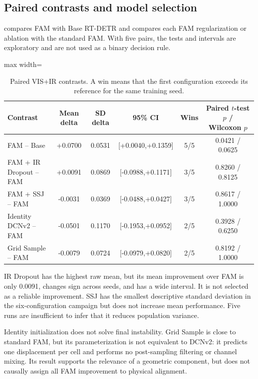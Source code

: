\subsection{Paired contrasts and model selection}

 compares FAM with Base RT-DETR and compares each FAM
regularization or ablation with the standard FAM. With five pairs, the tests
and intervals are exploratory and are not used as a binary decision rule.

\begin{table}[htbp]
  \centering
  \caption{Paired VIS+IR \mapfifty{} contrasts. A win means that the first
  configuration exceeds its reference for the same training seed.}
  \label{tab:rtdetr-contrasts}
  \begin{adjustbox}{max width=\textwidth}
  \begin{tabular}{lccccc}
    \toprule
    Contrast & Mean delta & SD delta & 95\% CI & Wins & Paired \(t\)-test \(p\) / Wilcoxon \(p\) \\
    \midrule
    FAM -- Base & +0.0700 & 0.0531 & [+0.0040,+0.1359] & 5/5 & 0.0421 / 0.0625 \\
    FAM + IR Dropout -- FAM & +0.0091 & 0.0869 & [-0.0988,+0.1171] & 3/5 & 0.8260 / 0.8125 \\
    FAM + SSJ -- FAM & -0.0031 & 0.0369 & [-0.0488,+0.0427] & 3/5 & 0.8617 / 1.0000 \\
    Identity DCNv2 -- FAM & -0.0501 & 0.1170 & [-0.1953,+0.0952] & 2/5 & 0.3928 / 0.6250 \\
    Grid Sample -- FAM & -0.0079 & 0.0724 & [-0.0979,+0.0820] & 2/5 & 0.8192 / 1.0000 \\
    \bottomrule
  \end{tabular}
  \end{adjustbox}
\end{table}

IR Dropout has the highest raw mean, but its mean improvement over FAM is only
0.0091, changes sign across seeds, and has a wide interval. It is not selected
as a reliable improvement. SSJ has the smallest descriptive standard deviation
in the six-configuration campaign but does not increase mean performance. Five
runs are insufficient to infer that it reduces population variance.

Identity initialization does not solve final instability. Grid Sample is close
to standard FAM, but its parameterization is not equivalent to DCNv2: it
predicts one displacement per cell and performs no post-sampling filtering or
channel mixing. Its result supports the relevance of a geometric component,
but does not causally assign all FAM improvement to physical alignment.

